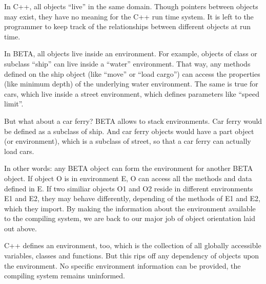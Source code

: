 In C++, all objects ``live'' in the same domain.  Though pointers
between objects may exist, they have no meaning for the C++ run
time system.  It is left to the programmer to keep track of the
relationships between different objects at run time.

In BETA, all objects live inside an environment.  For example,
objects of class or subclass ``ship'' can live inside a ``water''
environment.  That way, any methods defined on the ship object
(like ``move'' or ``load cargo'') can access the properties (like
minimum depth) of the underlying water environment.  The same
is true for cars, which live inside a street environment,
which defines parameters like ``speed limit''.

But what about a car ferry?  BETA allows to stack environments.
Car ferry would be defined as a subclass of ship.  And car
ferry objects would have a part object (or environment), which
is a subclass of street, so that a car ferry can actually load
cars.

In other words: any BETA object can form the environment for
another BETA object.  If object O is in environment E, O can
access all the methods and data defined in E.  If two similiar
objects O1 and O2 reside in different environments E1 and E2,
they may behave differently, depending of the methods of E1 and
E2, which they import.  By making the information about the
environment available to the compiling system, we are back to our
major job of object orientation laid out above.

C++ defines an environment, too, which is the collection of all
globally accessible variables, classes and functions.  But this
rips off any dependency of objects upon the environment.  No
specific environment information can be provided, the compiling
system remains uninformed.
